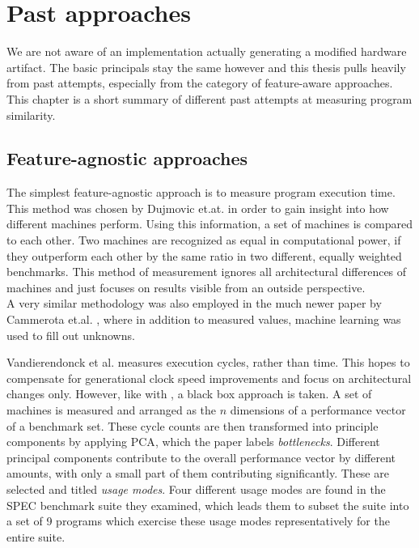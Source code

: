 \documentclass[../bachelor_paper.tex]{subfiles}
\begin{document}
\chapter{Past approaches}
	\label{ch:prob}
We are not aware of an implementation actually generating a modified hardware artifact. The basic principals stay the same however and this thesis pulls heavily from past attempts, especially from the category of feature-aware approaches. This chapter is a short summary of different past attempts at measuring program similarity.

\section{Feature-agnostic approaches}
	\label{sec:prob/agno}
The simplest feature-agnostic approach is to measure program execution time. This method was chosen by Dujmovic et.at. \cite{dujmovicEvolutionEvaluationSPEC1998} in order to gain insight into how different machines perform. Using this information, a set of machines is compared to each other. Two machines are recognized as equal in computational power, if they outperform each other by the same ratio in two different, equally weighted benchmarks. This method of measurement ignores all architectural differences of machines and just focuses on results visible from an outside perspective.\\
A very similar methodology was also employed in the much newer paper by Cammerota et.al. \cite{cammarotaOptimizingProgramPerformance2013}, where in addition to measured values, machine learning was used to fill out unknowns.

Vandierendonck et al. \cite{vandierendonckManyBenchmarksStress} measures execution cycles, rather than time. This hopes to compensate for generational clock speed improvements and focus on architectural changes only. However, like with \cite{dujmovicEvolutionEvaluationSPEC1998}, a black box approach is taken. A set of machines is measured and arranged as the $n$ dimensions of a performance vector of a benchmark set. These cycle counts are then transformed into principle components by applying \ac{PCA}, which the paper labels \emph{bottlenecks}. Different principal components contribute to the overall performance vector by different amounts, with only a small part of them contributing significantly. These are selected and titled \emph{usage modes}. Four different usage modes are found in the \ac{SPEC} benchmark suite they examined, which leads them to subset the suite into a set of 9 programs which exercise these usage modes representatively for the entire suite.
\end{document}
